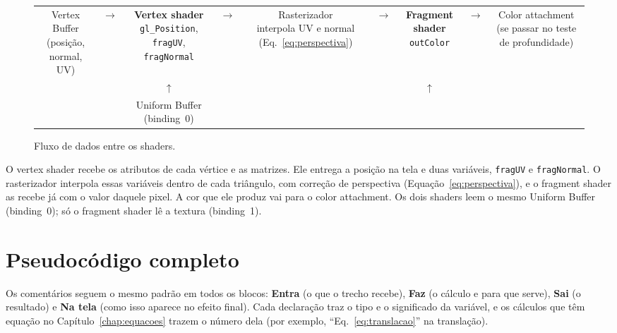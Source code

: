 \begin{figure}[htbp]
\centering
\footnotesize
\setlength{\tabcolsep}{3pt}
\begin{tabular}{ccccccccc}
\fbox{\parbox{1.8cm}{\centering Vertex Buffer\\(posição, normal, UV)}} & \(\rightarrow\) &
\fbox{\parbox{2.1cm}{\centering \textbf{Vertex shader}\\\texttt{gl\_Position}, \texttt{fragUV}, \texttt{fragNormal}}} & \(\rightarrow\) &
\fbox{\parbox{2.1cm}{\centering Rasterizador\\interpola UV e normal (Eq.~\ref{eq:perspectiva})}} & \(\rightarrow\) &
\fbox{\parbox{2.0cm}{\centering \textbf{Fragment shader}\\\texttt{outColor}}} & \(\rightarrow\) &
\fbox{\parbox{2.0cm}{\centering Color attachment\\(se passar no teste de profundidade)}} \\[2pt]
& & \(\uparrow\) & & & & \(\uparrow\) & & \\
& & \fbox{\parbox{2.1cm}{\centering Uniform Buffer\\(binding~0)}} & & & &
\fbox{\parbox{2.0cm}{\centering Uniform Buffer (binding~0) e textura (binding~1)}} & &
\end{tabular}
\caption{Fluxo de dados entre os shaders.}
\label{fig:fluxo-shaders}
\end{figure}

O vertex shader recebe os atributos de cada vértice e as matrizes. Ele entrega a posição na tela e duas variáveis, \texttt{fragUV} e \texttt{fragNormal}. O rasterizador interpola essas variáveis dentro de cada triângulo, com correção de perspectiva (Equação~\eqref{eq:perspectiva}), e o fragment shader as recebe já com o valor daquele pixel. A cor que ele produz vai para o color attachment. Os dois shaders leem o mesmo Uniform Buffer (binding~0); só o fragment shader lê a textura (binding~1).

\section{Pseudocódigo completo}

Os comentários seguem o mesmo padrão em todos os blocos: \textbf{Entra} (o que o trecho recebe), \textbf{Faz} (o cálculo e para que serve), \textbf{Sai} (o resultado) e \textbf{Na tela} (como isso aparece no efeito final). Cada declaração traz o tipo e o significado da variável, e os cálculos que têm equação no Capítulo~\ref{chap:equacoes} trazem o número dela (por exemplo, ``Eq.~\ref{eq:translacao}'' na translação).

